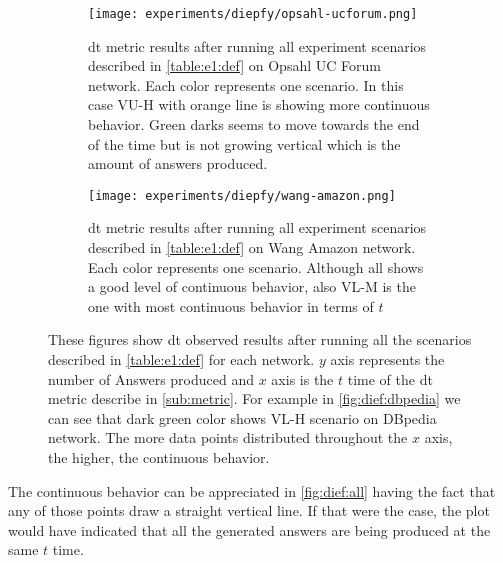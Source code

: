 \begin{figure}[!htp]
  \begin{subfigure}[t]{0.45\textwidth}
   \texttt{[image: experiments/diepfy/opsahl-ucforum.png]}
    \caption[{[EE] \acrshort{dt} Results: Opsahl UC Forum}]{\acrshort{dt} metric results after running all experiment scenarios described in \autoref{table:e1:def} on Opsahl UC Forum network. Each color represents one scenario. In this case VU-H with orange line is showing more continuous behavior. Green darks seems to move towards the end of the time but is not growing vertical which is the amount of answers produced.}
    \label{fig:dief:opsahl}
  \end{subfigure}\hfill
  \begin{subfigure}[t]{0.45\textwidth}
    \texttt{[image: experiments/diepfy/wang-amazon.png]}
     \caption[{[EE] \acrshort{dt} Results: Wang Amazon}]{\acrshort{dt} metric results after running all experiment scenarios described in \autoref{table:e1:def} on Wang Amazon network. Each color represents one scenario. Although all shows a good level of continuous behavior, also VL-M is the one with most continuous behavior in terms of $t$}
     \label{fig:dief:wang}
   \end{subfigure}
   \caption[{[EE] \acrshort{dt} General Results}]{These figures show \acrshort{dt} observed results after running all the scenarios described in \autoref{table:e1:def} for each network. $y$ axis represents the number of Answers produced and $x$ axis is the $t$ time of the \acrshort{dt} metric describe in \autoref{sub:metric}. For example in \autoref{fig:dief:dbpedia} we can see that dark green color shows VL-H scenario on DBpedia network. The more data points distributed throughout the $x$ axis, the higher, the continuous behavior.}
   \label{fig:dief:all}
 \end{figure}

The continuous behavior can be appreciated in \autoref{fig:dief:all} having the fact that any of those points draw a straight vertical line. 
If that were the case, the plot would have indicated that all the generated answers are being produced at the same $t$ time.


